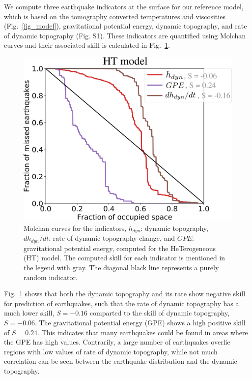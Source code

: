 \documentclass[draft,linenumbers]{agujournal2018}
\begin{document}
We compute three earthquake indicators at the surface for our reference model, which is based on the tomography converted temperatures and viscosities (Fig.~\ref{fig_model}), gravitational potential energy, dynamic topography, and rate of dynamic topography (Fig. S1). These indicators are quantified using Molchan curves and their associated skill is calculated in Fig.~\ref{ref_skill}.
%
\begin{figure}
\centering
	\includegraphics[width=0.65\linewidth]{figures/reference_model_results.png}
	\caption{Molchan curves for the indicators, $h_{dyn}$: dynamic topography, $dh_{dyn}/dt$: rate of dynamic topography change, and $GPE$: gravitational potential energy, computed for the HeTerogeneous (HT) model. The computed skill for each indicator is mentioned in the legend with gray. The diagonal black line represents a purely random indicator. }
	\label{ref_skill}
\end{figure}

Fig.~\ref{ref_skill} shows that both the dynamic topography and its rate show negative skill for prediction of earthquakes, such that the rate of dynamic topography has a much lower skill, $S=-0.16$ comparted to the skill of dynamic topography, $S=-0.06$. The gravitational potential energy (GPE) shows a high positive skill of $S=0.24$. This indicates that many earthquakes could be found in areas where the GPE has high values. Contrarily, a large number of earthquakes overlie regions with low values of rate of dynamic topography, while not much correlation can be seen between the earthquake distribution and the dynamic topography.
\end{document}
